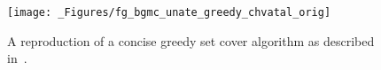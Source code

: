 \begin{figure}[h!]
\vspace*{-2ex}
\centering
\texttt{[image: \_Figures/fg\_bgmc\_unate\_greedy\_chvatal\_orig]}

\caption{
A reproduction of a concise greedy set cover algorithm as described 
in~\cite{OPUS-setc-2016-Springer-Young-Greedy}.
}
\label{fg_bgmc_unate_greedy_chvatal_orig}
\end{figure}
